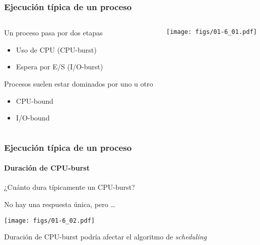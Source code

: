 \documentclass[letter]{beamer}
\begin{document}
%
%
%  
%


\begin{frame}
  \frametitle{Ejecución típica de un proceso}

  \begin{columns}
  \begin{column}[T]{8cm}
    Un proceso pasa por dos etapas
    \begin{itemize}
      \item Uso de CPU (CPU-burst)
      \item Espera por E/S (I/O-burst)
    \end{itemize}
    Procesos suelen estar dominados por uno u otro
    \begin{itemize}
      \item CPU-bound
      \item I/O-bound
    \end{itemize}
  \end{column}  
  \begin{column}[T]{4cm}
    \texttt{[image: figs/01-6\_01.pdf]}
  \end{column}
  \end{columns}

\end{frame}

\begin{frame}
  \frametitle{Ejecución típica de un proceso}
  \framesubtitle{Duración de CPU-burst}
  
  ¿Cuánto dura típicamente un CPU-burst?
  
  No hay una respuesta única, pero \ldots
  
  \begin{center}
    \texttt{[image: figs/01-6\_02.pdf]}
  \end{center}
  
  Duración de CPU-burst podría afectar el algoritmo de {\em scheduling}

\end{frame}
\end{document}
